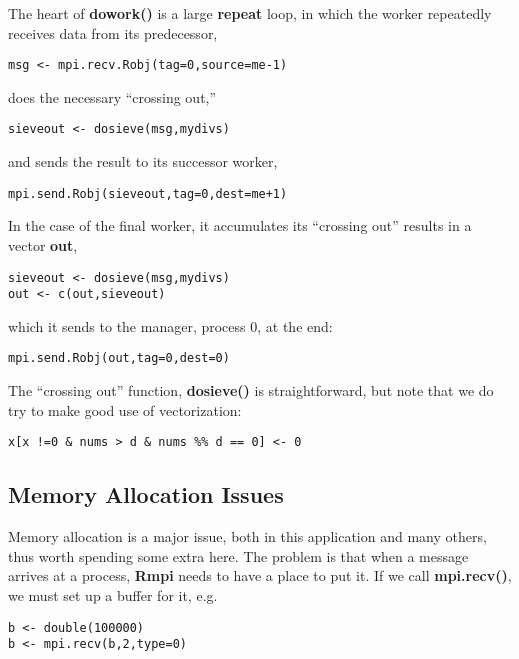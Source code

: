 The heart of {\bf dowork()} is a large {\bf repeat} loop, in which the
worker repeatedly receives data from its predecessor, 

\begin{lstlisting}
msg <- mpi.recv.Robj(tag=0,source=me-1)
\end{lstlisting}

does the necessary ``crossing out,'' 

\begin{lstlisting}
sieveout <- dosieve(msg,mydivs)
\end{lstlisting}

and sends the result to its successor worker,

\begin{lstlisting}
mpi.send.Robj(sieveout,tag=0,dest=me+1)
\end{lstlisting}

In the case of the final worker, it accumulates its ``crossing out''
results in a vector {\bf out},

\begin{lstlisting}
sieveout <- dosieve(msg,mydivs)
out <- c(out,sieveout)
\end{lstlisting}

which it sends to the manager, process 0, at the end:

\begin{lstlisting}
mpi.send.Robj(out,tag=0,dest=0)
\end{lstlisting}

The ``crossing out'' function, {\bf dosieve()} is straightforward, but
note that we do try to make good use of vectorization:

\begin{lstlisting}
x[x !=0 & nums > d & nums %% d == 0] <- 0
\end{lstlisting}

\subsection{Memory Allocation Issues}
\label{memallocissues}

Memory allocation is a major issue, both in this application and
many others, thus worth spending some extra here.  The problem is that
when a message arrives at a process, {\bf Rmpi} needs to have a place to
put it.  If we call {\bf mpi.recv()}, we must set up a buffer for it,
e.g.

\begin{lstlisting}
b <- double(100000)
b <- mpi.recv(b,2,type=0)
\end{lstlisting}

